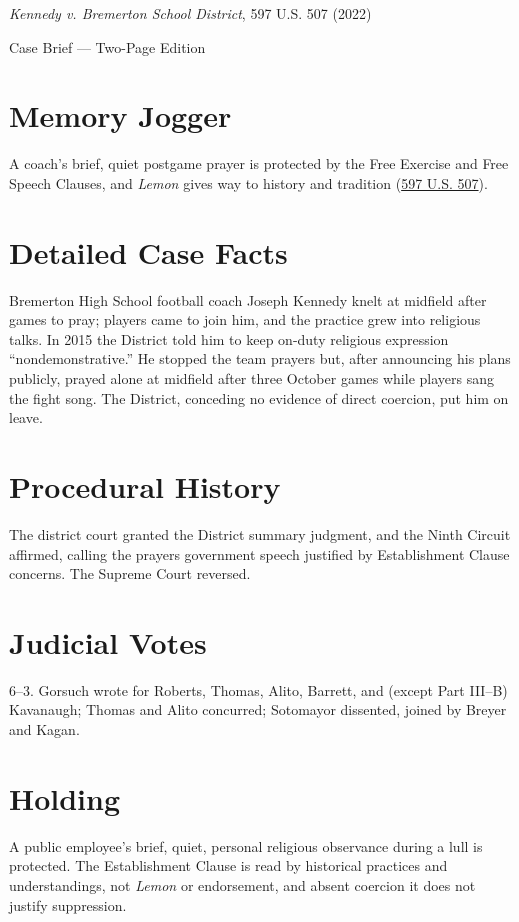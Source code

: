 \documentclass[12pt]{article}
\begin{document}
\begin{center}
{\LARGE \textit{Kennedy v. Bremerton School District}, 597 U.S. 507 (2022)\par}
\vspace{0.5em}
{\large Case Brief --- Two-Page Edition\par}
\end{center}

\section{Memory Jogger}
A coach's brief, quiet postgame prayer is protected by the Free Exercise and Free Speech Clauses, and \textit{Lemon} gives way to history and tradition (\href{https://www.law.cornell.edu/supremecourt/text/21-418}{597 U.S. 507}).

\section{Detailed Case Facts}
Bremerton High School football coach Joseph Kennedy knelt at midfield after games to pray; players came to join him, and the practice grew into religious talks. In 2015 the District told him to keep on-duty religious expression ``nondemonstrative.'' He stopped the team prayers but, after announcing his plans publicly, prayed alone at midfield after three October games while players sang the fight song. The District, conceding no evidence of direct coercion, put him on leave.

\section{Procedural History}
The district court granted the District summary judgment, and the Ninth Circuit affirmed, calling the prayers government speech justified by Establishment Clause concerns. The Supreme Court reversed.

\section{Judicial Votes}
6--3. Gorsuch wrote for Roberts, Thomas, Alito, Barrett, and (except Part III--B) Kavanaugh; Thomas and Alito concurred; Sotomayor dissented, joined by Breyer and Kagan.

\section{Holding}
A public employee's brief, quiet, personal religious observance during a lull is protected. The Establishment Clause is read by historical practices and understandings, not \textit{Lemon} or endorsement, and absent coercion it does not justify suppression.
\end{document}
